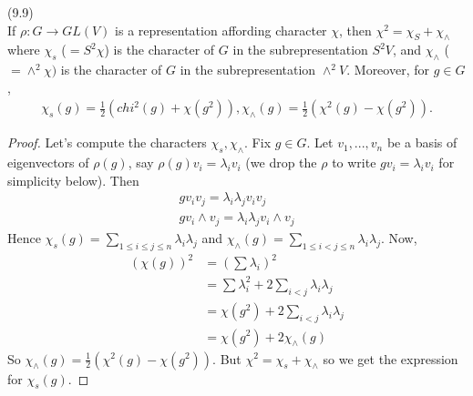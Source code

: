 \documentclass[a4paper]{article}
\begin{document}
\begin{lemma} (9.9)\\
If $\rho:G \to GL(V)$ is a representation affording character $\chi$, then $\chi^2 = \chi_S + \chi_\wedge$ where $\chi_s$ ($=S^2 \chi$) is the character of $G$ in the subrepresentation $S^2 V$, and $\chi_\wedge$ ($=\wedge^2 \chi)$ is the character of $G$ in the subrepresentation $\wedge^2 V$. Moreover, for $g \in G$,
\begin{equation*}
\begin{aligned}
\chi_s(g) = \frac{1}{2} (chi^2(g) + \chi(g^2)),
\chi_\wedge(g) = \frac{1}{2} (\chi^2(g) - \chi(g^2)).
\end{aligned}
\end{equation*}
\begin{proof}
Let's compute the characters $\chi_s,\chi_\wedge$. Fix $g \in G$. Let $v_1,...,v_n$ be a basis of eigenvectors of $\rho(g)$, say $\rho(g)v_i = \lambda_i v_i$ (we drop the $\rho$ to write $g v_i = \lambda_i v_i$ for simplicity below). Then
\begin{equation*}
\begin{aligned}
g v_i v_j = \lambda_i \lambda_j v_i v_j\\
g v_i \wedge v_j = \lambda_i \lambda_j v_i \wedge v_j
\end{aligned}
\end{equation*}
Hence $\chi_s(g) = \sum_{1 \leq i \leq j \leq n} \lambda_i\lambda_j$ and $\chi_\wedge(g) = \sum_{1 \leq i < j \leq n} \lambda_i \lambda_j$. Now,
\begin{equation*}
\begin{aligned}
(\chi(g))^2 &= (\sum \lambda_i)^2\\
&= \sum \lambda_i^2 + 2\sum_{i < j} \lambda_i \lambda_j\\
&= \chi(g^2) + 2\sum_{i < j} \lambda_i \lambda_j\\
&= \chi(g^2) + 2 \chi_\wedge (g)
\end{aligned}
\end{equation*}
So $\chi_\wedge (g) = \frac{1}{2} (\chi^2 (g) - \chi(g^2))$. But $\chi^2 = \chi_s + \chi_\wedge$ so we get the expression for $\chi_s(g)$.
\end{proof}
\end{lemma}
\end{document}
